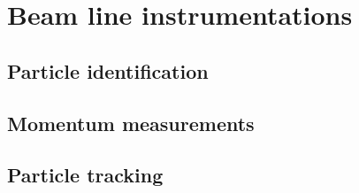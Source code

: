 \section{Beam line instrumentations}
\label{sec:beaminstruments}

\subsection{Particle identification}

\subsection{Momentum measurements}

\subsection{Particle tracking}




